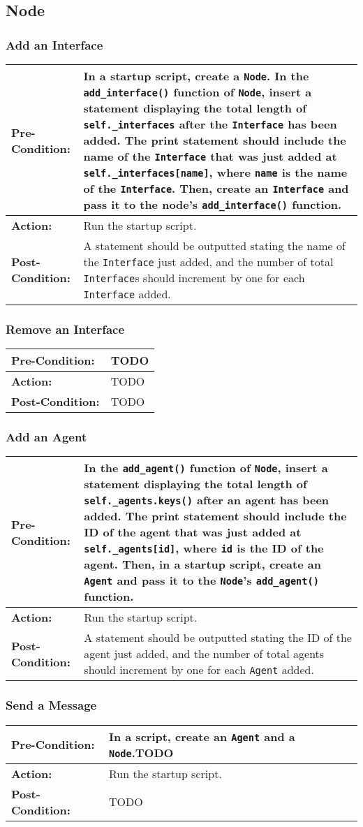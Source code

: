 \documentclass[titlepage]{article}
\newcommand{\testcase}[3]{
    \begin{center}
    \begin{tabular}{| l | p{0.7\textwidth}|}
        \hline
        \rowcolor[gray]{0.8}\textbf{Pre-Condition:} & #1 \\ \hline
        \textbf{Action:} & #2 \\ \hline
        \rowcolor[gray]{0.8}\textbf{Post-Condition:} & #3 \\ \hline
    \end{tabular}
    \end{center}
}
\begin{document}
\subsection{Node}
\subsubsection{Add an Interface}
\testcase{In a startup script, create a \texttt{Node}.  In the \texttt{add\_interface()} function of \texttt{Node}, insert a statement displaying the total length of \texttt{self.\_interfaces} after the \texttt{Interface} has been added. The print statement should include the name of the \texttt{Interface} that was just added at \texttt{self.\_interfaces[name]}, where \texttt{name} is the name of the \texttt{Interface}.  Then, create an \texttt{Interface} and pass it to the node's \texttt{add\_interface()} function.}{Run the startup script.}{A statement should be outputted stating the name of the \texttt{Interface} just added, and the number of total \texttt{Interface}s should increment by one for each \texttt{Interface} added.}

\subsubsection{Remove an Interface}
\testcase{TODO}{TODO}{TODO}

\subsubsection{Add an Agent}
\testcase{In the \texttt{add\_agent()} function of \texttt{Node}, insert a statement displaying the total length of \texttt{self.\_agents.keys()} after an agent has been added. The print statement should include the ID of the agent that was just added at \texttt{self.\_agents[id]}, where \texttt{id} is the ID of the agent.  Then, in a startup script, create an \texttt{Agent} and pass it to the \texttt{Node}'s \texttt{add\_agent()} function.}{Run the startup script.}{A statement should be outputted stating the ID of the agent just added, and the number of total agents should increment by one for each \texttt{Agent} added.}

\subsubsection{Send a Message}
\testcase{In a script, create an \texttt{Agent} and a \texttt{Node}.TODO}{Run the startup script.}{TODO}
\end{document}

